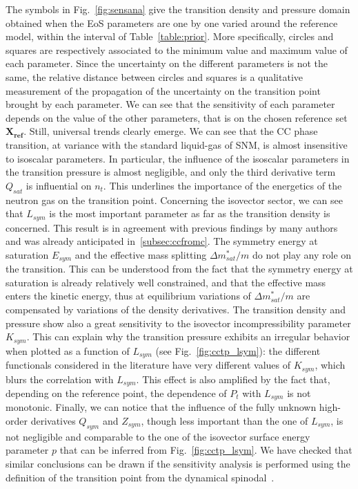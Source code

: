 The symbols in Fig.~\ref{fig:sensana} give the transition density and 
pressure domain obtained when the EoS parameters are one by one varied around 
the reference model, within the interval of Table~\ref{table:prior}. More
specifically, circles and squares are respectively associated to the minimum
value and maximum value of each parameter.
Since the uncertainty on the different parameters is not the same, the 
relative distance between circles and squares is a qualitative measurement of 
the propagation of the uncertainty on the transition point brought by each 
parameter. We can see that the sensitivity of each parameter depends on the 
value of the other parameters, that is on the chosen reference set 
$\bm{X_{ref}}$. Still, universal trends clearly emerge. We can see that the CC 
phase transition, at variance with the 
standard liquid-gas of SNM, is almost insensitive to isoscalar parameters. 
In particular, the influence of the isoscalar parameters in the 
transition pressure is almost negligible, and only the third derivative term 
$Q_{sat}$ is influential on $n_t$. This underlines the importance of 
the energetics of the neutron gas on the transition point. Concerning the 
isovector sector, we can see that $L_{sym}$ is the most important 
parameter as far as the transition density is concerned. This result is in 
agreement with previous findings by many authors~\cite{Ducoin2011} and was
already anticipated in~\ref{subsec:ccfromc}.
The symmetry energy at saturation $E_{sym}$ and the effective mass splitting
$\Delta m_{sat}^*/m$ do not play any role on the transition. 
{This can be understood from the fact that the symmetry energy at
saturation is already relatively well constrained, and that the effective mass 
enters the kinetic energy, thus at equilibrium variations of 
$\Delta m_{sat}^*/m$ are compensated by variations of the density derivatives.} 
The transition density and pressure show also a great 
sensitivity to the isovector incompressibility parameter $K_{sym}$. 
This can explain why the transition pressure exhibits an irregular behavior 
when plotted as a function of $L_{sym}$ (see Fig.~\ref{fig:cctp_lsym}): the 
different functionals considered in the literature have very different values 
of $K_{sym}$, which blurs the correlation with $L_{sym}$. This effect is also 
amplified by the fact that, depending on the reference point, the dependence of 
$P_t$ with $L_{sym}$ is not monotonic. Finally, we can notice that the 
influence of the fully unknown high-order derivatives $Q_{sym}$ and $Z_{sym}$, 
though less important than the one of $L_{sym}$, is not negligible and 
comparable to the one of the isovector surface energy parameter $p$ that can be 
inferred from Fig.~\ref{fig:cctp_lsym}. We have checked that similar 
conclusions can be drawn if the sensitivity analysis is performed using the 
definition of the transition point from the dynamical 
spinodal~\cite{Antic2019}.

